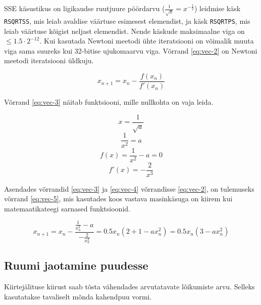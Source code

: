 \documentclass[a4paper,12pt]{report}
\begin{document}
SSE käsustikus on ligikaudse ruutjuure pöördarvu (\(\frac 1 {\sqrt x} = x^{-\frac12}\)) leidmise käsk
\texttt{RSQRTSS}, mis leiab avaldise väärtuse esimesest elemendist, ja
käsk \texttt{RSQRTPS}, mis leiab väärtuse kõigist neljast elemendist.
Nende käskude maksimaalne viga on \(\leq 1.5 \cdot 2^{-12}\). Kui kasutada Newtoni
meetodi ühte iteratsiooni on võimalik muuta viga sama suureks kui 32-bitise
ujukomaarvu viga. Võrrand \ref{eq:vec-2} on Newtoni meetodi iteratsiooni
üldkuju.

\begin{equation} \label{eq:vec-2}
x_{n+1} = x_n - \frac {f(x_n)}{f'(x_n)}
\end{equation}

Võrrand \ref{eq:vec-3} näitab funktsiooni, mille nullkohta on vaja leida.

\[x = \frac 1 {\sqrt a}\]
\[\frac 1{x^2} = a\]
\begin{equation} \label{eq:vec-3}
f(x) = \frac 1{x^2} - a = 0
\end{equation}
\begin{equation} \label{eq:vec-4}
f'(x) = -\frac 2{x^3}
\end{equation}

Asendades võrrandid \ref{eq:vec-3} ja \ref{eq:vec-4} võrrandisse \ref{eq:vec-2},
on tulemuseks võrrand \ref{eq:vec-5}, mis kasutades koos vastava masinkäsuga
on kiirem kui matemaatikateegi sarnased funktsioonid.

\begin{equation} \label{eq:vec-5}
x_{n+1} = x_n - \frac {\frac 1{x_n^2} - a}{-\frac 2{x_n^3}} = 0.5x_n(2 + 1 - ax_n^2) = 0.5x_n(3-ax_n^2)
\end{equation}

\subsection{Ruumi jaotamine puudesse}
Kiirtejälituse kiirust saab tõsta vähendades arvutatavate lõikumiste arvu.
Selleks kasutatakse tavaliselt mõnda kahendpuu vormi.
\end{document}
